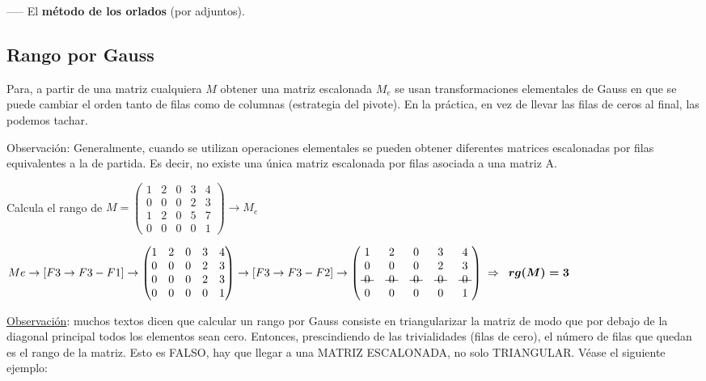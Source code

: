 \hspace{3mm} ----- El \textbf{método de los orlados} (por adjuntos).

\subsection{Rango por Gauss} \label{escalonado}


Para, a partir de una matriz cualquiera $M$ obtener una matriz escalonada $M_e$ se usan transformaciones elementales de Gauss en que se puede cambiar el orden tanto de filas como de columnas (estrategia del pivote). En la práctica, en vez de llevar las filas de ceros al final, las podemos tachar.

Observación: Generalmente, cuando se utilizan operaciones elementales se pueden obtener diferentes matrices escalonadas por filas equivalentes a la de partida. Es decir, no existe una única matriz escalonada por filas asociada a una matriz A. 

\begin{ejem}
Calcula el rango de  $M	= \left( \begin{matrix} 1&2&0&3&4\\0&0&0&2&3\\1&2&0&5&7\\0&0&0&0&1  \end{matrix} \right) \to M_e$

$Me \to [F3\to F3-F1] \to \left( \begin{matrix} 1&2&0&3&4\\0&0&0&2&3\\0&0&0&2&3\\0&0&0&0&1  \end{matrix} \right) \to [F3\to F3-F2]  \to   \left( \begin{matrix} 1&2&0&3&4\\0&0&0&2&3\\ \text{\textst{ 0 }}&\text{\textst{ 0 }}&\text{\textst{ 0 }}&\text{\textst{ 0 }}&\text{\textst{ 0 }} \\0&0&0&0&1  \end{matrix} \right) \; \Rightarrow \; \;  \boldsymbol{ rg(M)=3 }$ 
\end{ejem}


\underline{Observación}: muchos textos dicen que calcular un rango por Gauss consiste en triangularizar la matriz de modo que por debajo de la diagonal principal todos los elementos sean cero. Entonces, prescindiendo de las trivialidades (filas de cero), el número de filas que quedan es el rango de la matriz. Esto es FALSO, hay que llegar a una MATRIZ ESCALONADA, no solo TRIANGULAR. Véase el siguiente ejemplo:

